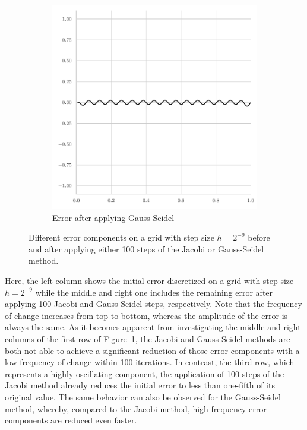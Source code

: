 \begin{figure}
\begin{subfigure}[b]{0.32\textwidth}
		\includegraphics[width=\textwidth]{figures/final_error_gauss_seidel_32pi.pdf}
	\caption{Error after applying Gauss-Seidel}
	\end{subfigure}
	\caption{Different error components on a grid with step size $h = 2^{-9}$ before and after applying either 100 steps of the Jacobi or Gauss-Seidel method.}
	\label{fig:different-error-components}
\end{figure}
Here, the left column shows the initial error discretized on a grid with step size $h = 2^{-9}$ while the middle and right one includes the remaining error after applying 100 Jacobi and Gauss-Seidel steps, respectively.
Note that the frequency of change increases from top to bottom, whereas the amplitude of the error is always the same.
As it becomes apparent from investigating the middle and right columns of the first row of Figure~\ref{fig:different-error-components}, the Jacobi and Gauss-Seidel methods are both not able to achieve a significant reduction of those error components with a low frequency of change within 100 iterations.
In contrast, the third row, which represents a highly-oscillating component, the application of 100 steps of the Jacobi method already reduces the initial error to less than one-fifth of its original value.
The same behavior can also be observed for the Gauss-Seidel method, whereby, compared to the Jacobi method, high-frequency error components are reduced even faster.

